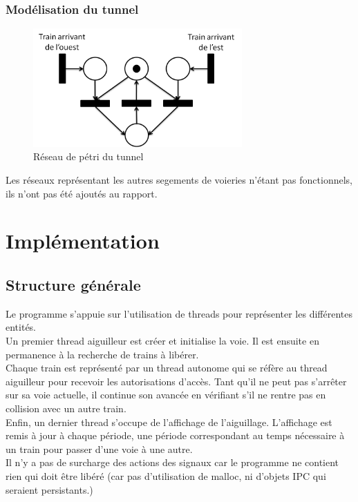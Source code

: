 \documentclass[a4paper, 12pt]{report}
\begin{document}
\subsection{Modélisation du tunnel}
\begin{figure}[hbtp]
\centering
\includegraphics[width=8cm]{Tunnel.png}
\caption{Réseau de pétri du tunnel}
\end{figure}

Les réseaux représentant les autres segements de voieries n'étant pas fonctionnels, ils n'ont pas été ajoutés au rapport. 

\chapter{Implémentation}
\section{Structure générale}
Le programme s'appuie sur l'utilisation de threads pour représenter les différentes entités. \\
Un premier thread aiguilleur est créer et initialise la voie. Il est ensuite en permanence à la recherche de trains à libérer.\\ \newline{}
Chaque train est représenté par un thread autonome qui se réfère au thread aiguilleur pour recevoir les autorisations d'accès. 
Tant qu'il ne peut pas s'arrêter sur sa voie actuelle, il continue son avancée 
en vérifiant s'il ne rentre pas en collision avec un autre train.\\
Enfin, un dernier thread s'occupe de l'affichage de l'aiguillage. 
L'affichage est remis à jour à chaque période, une période correspondant au temps nécessaire à un train pour passer d'une voie à une autre. \\ \newline{}
Il n'y a pas de surcharge des actions des signaux car le programme ne contient rien qui doit être libéré 
(car pas d'utilisation de malloc, ni d'objets IPC qui seraient persistants.)
\end{document}
